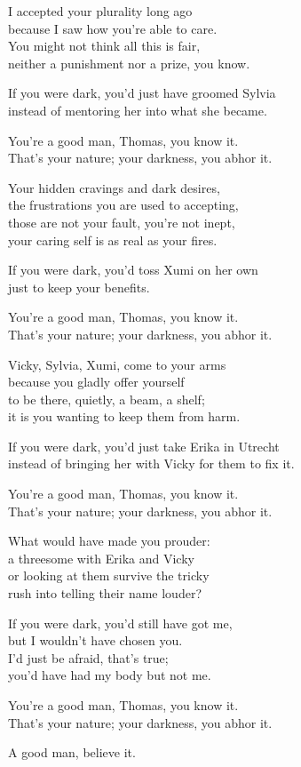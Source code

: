 \begin{lyrics}
I accepted your plurality long ago\\
because I saw how you're able to care.\\
You might not think all this is fair,\\
neither a punishment nor a prize, you know.

If you were dark, you'd just have groomed Sylvia\\
instead of mentoring her into what she became.

You're a good man, Thomas, you know it.\\
That's your nature; your darkness, you abhor it.

Your hidden cravings and dark desires,\\
the frustrations you are used to accepting,\\
those are not your fault, you're not inept,\\
your caring self is as real as your fires.

If you were dark, you'd toss Xumi on her own\\
just to keep your benefits.

You're a good man, Thomas, you know it.\\
That's your nature; your darkness, you abhor it.

Vicky, Sylvia, Xumi, come to your arms\\
because you gladly offer yourself\\
to be there, quietly, a beam, a shelf;\\
it is you wanting to keep them from harm.

If you were dark, you'd just take Erika in Utrecht\\
instead of bringing her with Vicky for them to fix it.

You're a good man, Thomas, you know it.\\
That's your nature; your darkness, you abhor it.

What would have made you prouder:\\
a threesome with Erika and Vicky\\
or looking at them survive the tricky\\
rush into telling their name louder?

If you were dark, you'd still have got me,\\
but I wouldn't have chosen you.\\
I'd just be afraid, that's true;\\
you'd have had my body but not me.

You're a good man, Thomas, you know it.\\
That's your nature; your darkness, you abhor it.

A good man, believe it.
\end{lyrics}

